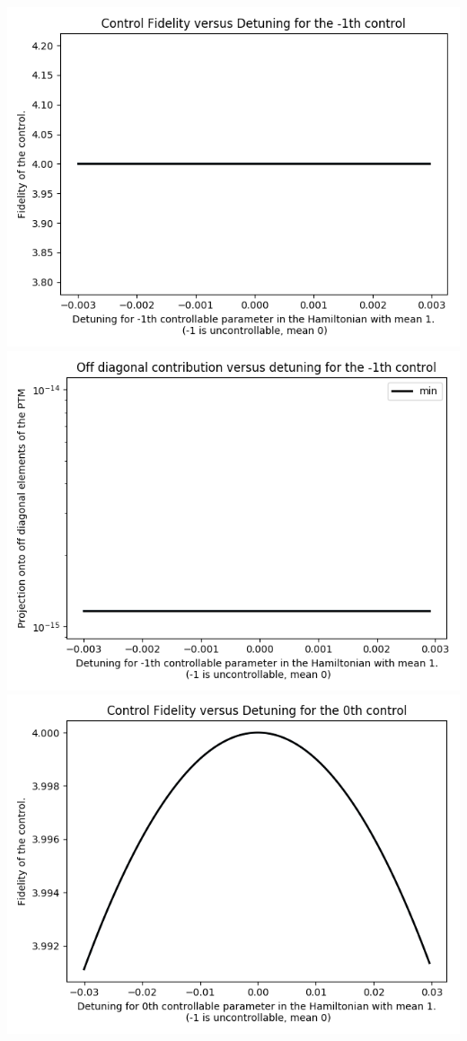 \documentclass{article}
\begin{document}
\begin{center}
\includegraphics[scale=.9]{control_fid_0}
\includegraphics[scale=.9]{off_diag_0}
\includegraphics[scale=.9]{control_fid_1}

\end{center}
\end{document}
